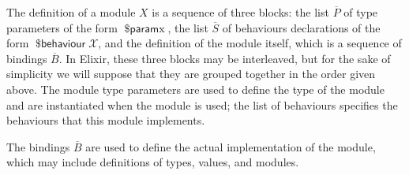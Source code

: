 \documentclass[a4paper,10pt]{article}
\DeclareMathOperator{\kwbvr}{\textsf{\$behaviour}}
\DeclareMathOperator{\kwprm}{\textsf{\$param}}
\newcommand{\tx}{\textrm{x}}
\begin{document}
The definition of a module $X$ is a sequence of three blocks: the list $\overline P$ of type parameters of the form $\kwprm \tx$, the list $\overline S$ of behaviours declarations of the form  $\kwbvr \mathcal X$, and the definition of the module itself, which is a sequence of bindings $\overline{B}$. In Elixir, these three blocks may be interleaved, but for the sake of simplicity we will suppose that they are grouped together in the order given above. The module type parameters are used to define the type of the module and are instantiated when the module is used; the list of behaviours specifies the behaviours that this module implements. 

The bindings $\overline{B}$ are used to define the actual implementation of the module, which may include definitions of types, values, and modules.
\end{document}
